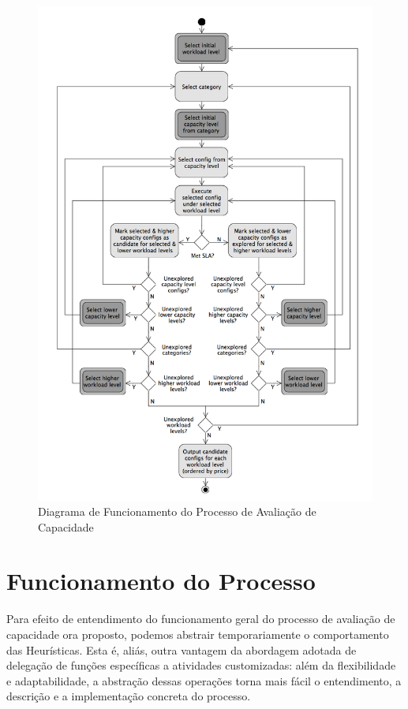 \begin{figure}
  \caption{\label{fig:fig_processo_aval_capacidade}Diagrama de Funcionamento do Processo de Avaliação de Capacidade}
  \begin{center}
    \includegraphics[scale=0.45]{img/capacity-planning-diagram-v13-mono}
  \end{center}
\end{figure}

\section{Funcionamento do Processo}
\label{sec:funcionamento_processo}
Para efeito de entendimento do funcionamento geral do processo de avaliação de 
capacidade ora proposto, podemos abstrair temporariamente o comportamento das 
Heurísticas. Esta é, aliás, outra vantagem da abordagem adotada de 
delegação de funções específicas a atividades customizadas: além da flexibilidade e 
adaptabilidade, a abstração dessas operações torna mais fácil o entendimento, 
a descrição e a implementação concreta do processo.

